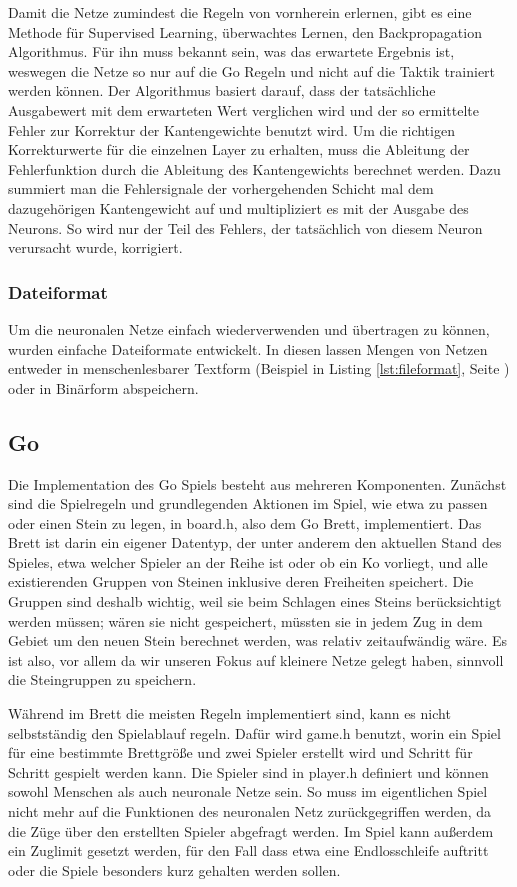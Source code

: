 Damit die Netze zumindest die Regeln von vornherein erlernen, gibt es eine
Methode für Supervised Learning, überwachtes Lernen, den Backpropagation
Algorithmus. Für ihn muss bekannt sein, was das erwartete Ergebnis ist, weswegen
die Netze so nur auf die Go Regeln und nicht auf die Taktik trainiert werden
können. Der Algorithmus basiert darauf, dass der tatsächliche Ausgabewert mit
dem erwarteten Wert verglichen wird und der so ermittelte Fehler zur Korrektur
der Kantengewichte benutzt wird. Um die richtigen Korrekturwerte für die
einzelnen Layer zu erhalten, muss die Ableitung der Fehlerfunktion durch die
Ableitung des Kantengewichts berechnet werden. Dazu summiert man die
Fehlersignale der vorhergehenden Schicht mal dem dazugehörigen Kantengewicht auf
und multipliziert es mit der Ausgabe des Neurons. So wird nur der Teil des
Fehlers, der tatsächlich von diesem Neuron verursacht wurde, korrigiert. 

\subsubsection{Dateiformat}
Um die neuronalen Netze einfach wiederverwenden und übertragen zu können,
wurden einfache Dateiformate entwickelt. In diesen lassen Mengen von Netzen
entweder in menschenlesbarer Textform (Beispiel in Listing
\ref{lst:fileformat}, Seite \pageref{lst:fileformat}) oder in Binärform
abspeichern.

\subsection{Go}

Die Implementation des Go Spiels besteht aus mehreren Komponenten. Zunächst sind
die Spielregeln und grundlegenden Aktionen im Spiel, wie etwa zu passen oder
einen Stein zu legen, in board.h, also dem Go Brett, implementiert. Das Brett
ist darin ein eigener Datentyp, der unter anderem den aktuellen Stand des
Spieles, etwa welcher Spieler an der Reihe ist oder ob ein Ko vorliegt, und alle
existierenden Gruppen von Steinen inklusive deren Freiheiten speichert. Die
Gruppen sind deshalb wichtig, weil sie beim Schlagen eines Steins berücksichtigt
werden müssen; wären sie nicht gespeichert, müssten sie in jedem Zug in dem
Gebiet um den neuen Stein berechnet werden, was relativ zeitaufwändig wäre. Es
ist also, vor allem da wir unseren Fokus auf kleinere Netze gelegt haben,
sinnvoll die Steingruppen zu speichern. 

Während im Brett die meisten Regeln implementiert sind, kann es nicht
selbstständig den Spielablauf regeln. Dafür wird game.h benutzt, worin ein Spiel
für eine bestimmte Brettgröße und zwei Spieler erstellt wird und Schritt für
Schritt gespielt werden kann. Die Spieler sind in player.h definiert und können
sowohl Menschen als auch neuronale Netze sein. So muss im eigentlichen Spiel
nicht mehr auf die Funktionen des neuronalen Netz zurückgegriffen werden, da die
Züge über den erstellten Spieler abgefragt werden. Im Spiel kann außerdem ein
Zuglimit gesetzt werden, für den Fall dass etwa eine Endlosschleife auftritt
oder die Spiele besonders kurz gehalten werden sollen. 

